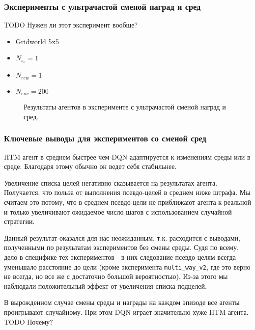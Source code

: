 \documentclass[a4paper]{article}
\begin{document}
\subsubsection{Эксперименты с ультрачастой сменой наград и сред}

TODO Нужен ли этот эксперимент вообще?

\begin{itemize}
  \item Gridworld 5x5
  \item $N_{s_0} = 1$
  \item $N_{rew} = 1$
  \item $N_{env} = 200$
\end{itemize}

\begin{figure}
  \centering
  \begin{minipage}{.49\linewidth}
    
  \end{minipage}
  \begin{minipage}{.49\linewidth}
    
  \end{minipage}
  \caption{Результаты агентов в эксперименте с ультрачастой сменой наград и сред.}
\end{figure}

\subsubsection {Ключевые выводы для экспериментов со сменой сред}

HTM агент в среднем быстрее чем DQN адаптируется к изменениям среды или в среде. Благодаря этому обычно он ведет себя стабильнее.

Увеличение списка целей негативно сказывается на результатах агента. Получается, что польза от выполнения псевдо-целей в среднем ниже штрафа. Мы считаем это потому, что в среднем псевдо-цели не приближают агента к реальной и только увеличивают ожидаемое число шагов с использованием случайной стратегии.

Данный результат оказался для нас неожиданным, т.к. расходится с выводами, полученными по результатам экспериментов без смены среды. Судя по всему, дело в специфике тех экспериментов - в них следование псевдо-целям всегда уменьшало расстояние до цели (кроме эксперимента \verb|multi_way_v2|, где это верно не всегда, но все же с достаточно большой вероятностью). Из-за этого мы наблюдали положительный эффект от увеличения списка подцелей.

В вырожденном случае смены среды и награды на каждом эпизоде все агенты проигрывают случайному. При этом DQN играет значительно хуже HTM агента. TODO Почему?
\end{document}

